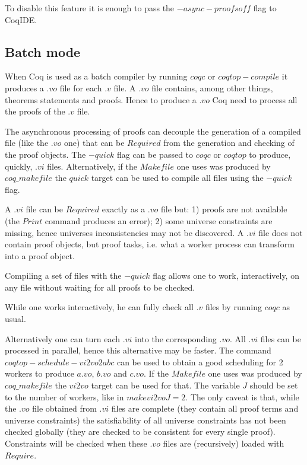 To disable this feature it is enough to pass the $-async-proofs off$ flag to
CoqIDE.

\subsection{Batch mode}

When Coq is used as a batch compiler by running $coqc$ or $coqtop -compile$
it produces a $.vo$ file for each $.v$ file.  A $.vo$ file contains, among
other things, theorems statements and proofs.  Hence to produce a $.vo$
Coq need to process all the proofs of the $.v$ file.

The asynchronous processing of proofs can decouple the generation of a
compiled file (like the $.vo$ one) that can be $Required$ from the generation
and checking of the proof objects.  The $-quick$ flag can be passed to
$coqc$ or $coqtop$ to produce, quickly, $.vi$ files.  Alternatively, if
the $Makefile$ one uses was produced by $coq\_makefile$ the $quick$
target can be used to compile all files using the $-quick$ flag.

A $.vi$ file can be $Required$ exactly as a $.vo$ file but: 1) proofs are
not available (the $Print$ command produces an error); 2) some universe
constraints are missing, hence universes inconsistencies may not be
discovered.  A $.vi$ file does not contain proof objects, but proof tasks,
i.e. what a worker process can transform into a proof object.

Compiling a set of files with the $-quick$ flag allows one to work,
interactively, on any file without waiting for all proofs to be checked.

While one works interactively, he can fully check all $.v$ files by
running $coqc$ as usual.

Alternatively one can turn each $.vi$ into the corresponding $.vo$.
All $.vi$ files can be processed in parallel, hence this alternative
may be faster.  The command $coqtop -schedule-vi2vo 2 a b c$
can be used to obtain a good scheduling for 2 workers to produce
$a.vo$, $b.vo$ and $c.vo$.  If the $Makefile$ one uses was produced
by $coq\_makefile$ the $vi2vo$ target can be used for that.
The variable $J$ should be set to the number of workers, like
in $make vi2vo J=2$.  The only caveat is that, while the $.vo$ file
obtained from $.vi$ files are complete (they contain all proof terms
and universe constraints) the satisfiability of all universe constraints
has not been checked globally (they are checked to be consistent for
every single proof).  Constraints will be checked when these $.vo$ files
are (recursively) loaded with $Require$.

